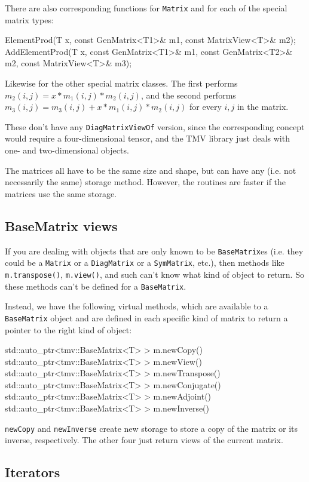 \documentclass[twoside,letterpaper,11pt]{article}
\renewcommand{\tt}[1]{{\lstinline {#1}}}
\begin{document}
There are also corresponding functions for \tt{Matrix} and for each of the special
matrix types:
\begin{tmvcode}
ElementProd(T x, const GenMatrix<T1>& m1, const MatrixView<T>& m2);
AddElementProd(T x, const GenMatrix<T1>& m1, const GenMatrix<T2>& m2,
      const MatrixView<T>& m3);
\end{tmvcode}
Likewise for the other special matrix classes.  The first performs 
$m_2(i,j) = x * m_1(i,j) * m_2(i,j)$, and the second performs
$m_3(i,j) = m_3(i,j) + x * m_1(i,j) * m_2(i,j)$ for every $i,j$ in the matrix.

These don't have any \tt{DiagMatrixViewOf} version, since the corresponding 
concept would require a four-dimensional tensor, and the TMV library
just deals with one- and two-dimensional objects.

The matrices all have to be the same size and shape, but can have any 
(i.e. not necessarily the same) storage method.  However, the routines are faster
if the matrices use the same storage.

\subsection{BaseMatrix views}

If you are dealing with objects that are only known to be \tt{BaseMatrix}es
(i.e. they could be a \tt{Matrix} or a \tt{DiagMatrix} or a \tt{SymMatrix}, etc.),
then methods like \tt{m.transpose()}, \tt{m.view()}, and such
can't know what kind of object to return.
So these methods can't be defined for a \tt{BaseMatrix}.  

Instead, we have the following virtual methods, 
which are available to a \tt{BaseMatrix}
object and are defined in each specific kind of matrix to return a pointer
to the right kind of object:
\begin{tmvcode}
std::auto_ptr<tmv::BaseMatrix<T> > m.newCopy()
std::auto_ptr<tmv::BaseMatrix<T> > m.newView()
std::auto_ptr<tmv::BaseMatrix<T> > m.newTranspose()
std::auto_ptr<tmv::BaseMatrix<T> > m.newConjugate()
std::auto_ptr<tmv::BaseMatrix<T> > m.newAdjoint()
std::auto_ptr<tmv::BaseMatrix<T> > m.newInverse()
\end{tmvcode}
\tt{newCopy} and \tt{newInverse} create new storage to store a copy of the 
matrix or its inverse, respectively.  The other four just return views of the current 
matrix.

\subsection{Iterators}
\end{document}
